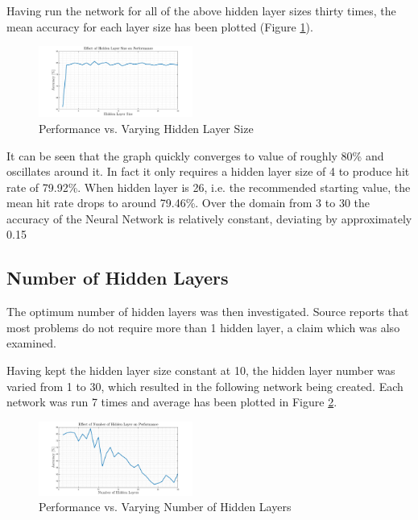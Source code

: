 \documentclass[10pt,twocolumn,letterpaper]{article}
\begin{document}
Having run the network for all of the above hidden layer sizes thirty times, the mean accuracy for each layer size has been plotted (Figure \ref{fig:HidSiz}).

\begin{figure}[H]
\centering
\includegraphics[width=0.45\textwidth]{../results/NN_HiddenLayer}
\caption{Performance vs. Varying Hidden Layer Size
\label{fig:HidSiz}}
\end{figure}

It can be seen that the graph quickly converges to value of roughly 80\% and oscillates around it. In fact it only requires a hidden layer size of 4 to produce hit rate of 79.92\%. When hidden layer is 26, i.e. the recommended starting value, the mean hit rate drops to around 79.46\%. Over the domain from 3 to 30 the accuracy of the Neural Network is relatively constant, deviating by approximately 0.15%

\subsection{Number of Hidden Layers}

The optimum number of hidden  layers was then investigated. Source \cite{NN_Java} reports that most problems do not require more than 1 hidden layer, a claim which was also examined.

Having kept the hidden layer size constant at 10, the hidden layer number was varied from 1 to 30, which resulted in the following network being created. Each network was run 7 times and average has been plotted in Figure \ref{fig:HidNum}.

\begin{figure}[H]
\centering
\includegraphics[width=0.45\textwidth]{../results/NN_HiddenLayerNum}
\caption{Performance vs. Varying Number of Hidden Layers
\label{fig:HidNum}}
\end{figure}
\end{document}
